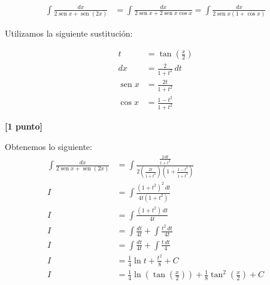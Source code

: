 \documentclass[a4paper,10pt]{article}
\newcommand{\dis}{\displaystyle}
\def\sin{\operatorname{sen}}
\begin{document}
\begin{enumerate}
\begin{align*}
 \dis \int \frac{dx}{2\sin x+\sin(2x)}  &= \dis \int \frac{dx}{2\sin x + 2\sin x \cos x} =  \dis \int \frac{dx}{2\sin x(1+\cos x)}
\end{align*}

Utilizamos la siguiente sustitución:\\

\begin{minipage}{.3\textwidth}
\raggedright
\begin{align*}
t  &= \tan \left(\frac{x}{2}\right)      \\
dx &= \frac{2}{1+t^2}  \, dt \\
\sin x &= \frac{2t}{1+t^2} \\
\cos x &= \frac{1-t^2}{1+t^2}
\end{align*}
\end{minipage}%
\begin{minipage}{.3\textwidth}
\raggedleft
{}
\end{minipage}

\dotfill \textbf{[1 punto]}


Obtenemos lo siguiente:
\begin{align*}
 \dis \int \frac{dx}{2\sin x+\sin(2x)}  &=   \dis \int \frac{\frac{2 \, dt}{1+t^2}}{2(\frac{2t}{1+t^2})(1+\frac{1-t^2}{1+t^2})} \\
I  &=   \dis \int \frac{(1+t^2)^2 \, dt}{4t(1+t^2)} \\
I  &=   \dis \int \frac{(1+t^2) \, dt}{4t} \\
I  &=   \dis \int \frac{dt}{4t} + \int \frac{t^2 \,dt}{4t} \\
I  &=   \dis \int \frac{dt}{4t} + \int \frac{t\,dt}{4} \\
I  &=   \dis  \frac{1}{4}\ln t +  \frac{t^2}{8} + C \\
I  &=   \dis  \frac{1}{4}\ln \left(\tan \left(\frac{x}{2}\right)\right) +  \frac{1}{8} \tan^2 \left(\frac{x}{2}\right) + C
\end{align*}


\end{enumerate}
\end{document}
